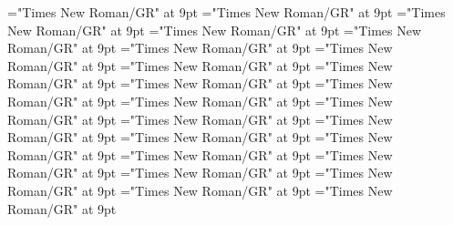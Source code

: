 \documentclass[gps1,twoside]{article}
\begin{document}
\font\spanspanreverseabbrvariantentrytypevariantentrytypesvariantformentrybackrefvariantformentrybackrefssensesensessubentrysubentriesentrybefore="Times New Roman/GR" at 9pt
\font\spanreverseabbrvariantentrytypevariantentrytypesvariantformentrybackrefvariantformentrybackrefssensesensessubentrysubentriesentrylastchildafter="Times New Roman/GR" at 9pt
\font\spanspanheadwordvariantformentrybackrefvariantformentrybackrefssensesensessubentrysubentriesentrybefore="Times New Roman/GR" at 9pt
\font\spanspanowningentrysummarydefinitionvariantformentrybackrefvariantformentrybackrefssensesensessubentrysubentriesentrybefore="Times New Roman/GR" at 9pt
\font\spanowningentrysummarydefinitionvariantformentrybackrefvariantformentrybackrefssensesensessubentrysubentriesentrylastchildafter="Times New Roman/GR" at 9pt
\font\scientificnamesensesensessubentrysubentriesentryafter="Times New Roman/GR" at 9pt
\font\semanticdomainsemanticdomainsemanticdomainssensesensessubentrysubentriesentrybefore="Times New Roman/GR" at 9pt
\font\semanticdomainssensesensessubentrysubentriesentrybefore="Times New Roman/GR" at 9pt
\font\semanticdomainssensesensessubentrysubentriesentryafter="Times New Roman/GR" at 9pt
\font\spanspanabbreviationsemanticdomainsemanticdomainssensesensessubentrysubentriesentrybefore="Times New Roman/GR" at 9pt
\font\spanabbreviationsemanticdomainsemanticdomainssensesensessubentrysubentriesentrylastchildafter="Times New Roman/GR" at 9pt
\font\spanspannamesemanticdomainsemanticdomainssensesensessubentrysubentriesentrybefore="Times New Roman/GR" at 9pt
\font\academicdomainacademicdomainacademicdomainssensesensessubentrysubentriesentrybefore="Times New Roman/GR" at 9pt
\font\academicdomainssensesensessubentrysubentriesentrybefore="Times New Roman/GR" at 9pt
\font\academicdomainssensesensessubentrysubentriesentryafter="Times New Roman/GR" at 9pt
\font\spanspanabbreviationacademicdomainacademicdomainssensesensessubentrysubentriesentrybefore="Times New Roman/GR" at 9pt
\font\spanspannameacademicdomainacademicdomainssensesensessubentrysubentriesentrybefore="Times New Roman/GR" at 9pt
\font\spannameacademicdomainacademicdomainssensesensessubentrysubentriesentryfirstchildbefore="Times New Roman/GR" at 9pt
\font\spannameacademicdomainacademicdomainssensesensessubentrysubentriesentrylastchildafter="Times New Roman/GR" at 9pt
\font\usageusageusagessensesensessubentrysubentriesentrybefore="Times New Roman/GR" at 9pt
\font\usagessensesensessubentrysubentriesentrybefore="Times New Roman/GR" at 9pt
\font\usagessensesensessubentrysubentriesentryafter="Times New Roman/GR" at 9pt
\font\spanspanabbreviationusageusagessensesensessubentrysubentriesentrybefore="Times New Roman/GR" at 9pt
\end{document}
